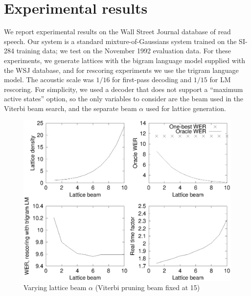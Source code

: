 \documentclass{article}
\begin{document}
\section{Experimental results}
\label{sec:exp}

We report experimental results on the Wall Street Journal database of
read speech.  
Our system is a standard mixture-of-Gaussians system trained on the SI-284
training data; we test on the November 1992 evaluation data.  
For these experiments, we generate lattices with the bigram language model
supplied with the WSJ database, and for rescoring experiments we
use the trigram language model.  The acoustic scale was $1/16$ for first-pass
decoding and $1/15$ for LM rescoring.  
For simplicity, we used a decoder that
does not support a ``maximum active states'' option, so the only variables
to consider are the beam used in the Viterbi beam search, and the separate
beam $\alpha$ used for lattice generation.


\begin{figure}
\centering
   \includegraphics[width=0.9\columnwidth]{figures/latbeam.eps} 
 \vspace*{-0.1in}
 
   \caption{\vspace*{-0.2in} Varying lattice beam $\alpha$ (Viterbi pruning beam fixed at 15) }
  \vspace{-0.08in}
  \label{fig:latbeam}
\end{figure}
\end{document}
